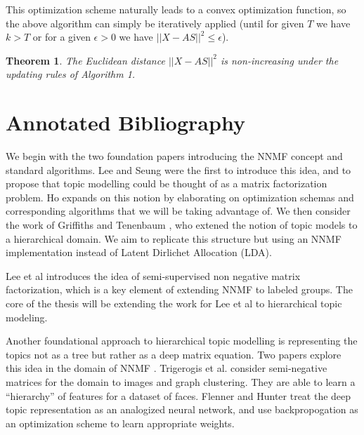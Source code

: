 \documentclass[12pt]{article}
\newtheorem{theorem}{Theorem}
\begin{document}
This optimization scheme naturally leads to a convex optimization function, so the above algorithm can simply be iteratively applied (until for given $T$ we have $k>T$ or for a given $\epsilon>0$ we have $||X-AS||^2 \leq \epsilon$).
\begin{theorem}
	The Euclidean distance $||X-AS||^2$ is non-increasing under the updating rules of Algorithm 1.
\end{theorem}

\section{Annotated Bibliography}
We begin with the two foundation papers introducing the NNMF concept and standard algorithms. Lee and Seung \cite{lee1999learning} were the first to introduce this idea, and to propose that topic modelling could be thought of as a matrix factorization problem. Ho \cite{ho2008nonnegative} expands on this notion by elaborating on optimization schemas and corresponding algorithms that we will be taking advantage of. We then consider the work of Griffiths and Tenenbaum \cite{griffiths2004hierarchical}, who extened the notion of topic models to a hierarchical domain. We aim to replicate this structure but using an NNMF implementation instead of Latent Dirlichet Allocation (LDA).

Lee et al \cite{lee2010semi} introduces the idea of semi-supervised non negative matrix factorization, which is a key element of extending NNMF to labeled groups. The core of the thesis will be extending the work for Lee et al to hierarchical topic modeling. 

Another foundational approach to hierarchical topic modelling is representing the topics not as a tree but rather as a deep matrix equation. Two papers explore this idea in the domain of NNMF \cite{trigeorgis2014deep, deepNonNeg}. Trigerogis et al. consider semi-negative matrices for the domain to images and graph clustering. They are able to learn a ``hierarchy'' of features for a dataset of faces. Flenner and Hunter treat the deep topic representation as an analogized neural network, and use backpropogation as an optimization scheme to learn appropriate weights. 




\end{document}
